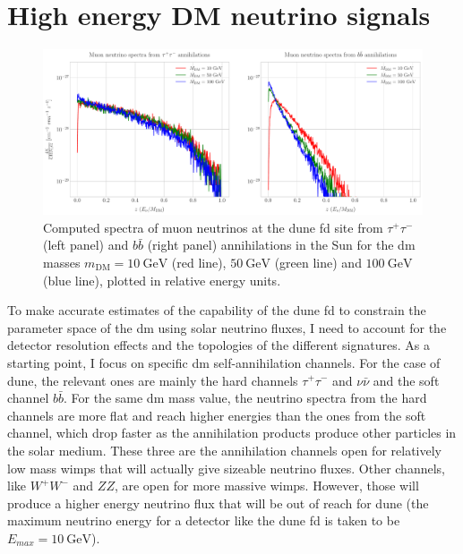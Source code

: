 \section{High energy DM neutrino signals}
\label{sec:dm_analysis_high_e_nu}

\begin{figure}[t]
	\centering
	\includegraphics[width=1\linewidth]{Images/DM_Analysis/solardm_nu_mu_spectra.pdf}
	\caption[Computed spectra of muon neutrinos at the \gls{dune} \gls{fd} site from $\tau^{+} \tau^{-}$ and $b\bar{b}$ annihilations in the Sun for different \gls{dm} masses.]{Computed spectra of muon neutrinos at the \gls{dune} \gls{fd} site from $\tau^{+} \tau^{-}$ (left panel) and $b\bar{b}$ (right panel) annihilations in the Sun for the \gls{dm} masses $m_{\mathrm{DM}} = 10 \ \mathrm{GeV}$ (red line), $50 \ \mathrm{GeV}$ (green line) and $100 \ \mathrm{GeV}$ (blue line), plotted in relative energy units.}
	\label{fig:solardm_nu_mu_spectra}
\end{figure}

To make accurate estimates of the capability of the \gls{dune} \gls{fd} to constrain the parameter space of the \gls{dm} using solar neutrino fluxes, I need to account for the detector resolution effects and the topologies of the different signatures. As a starting point, I focus on specific \gls{dm} self-annihilation channels. For the case of \gls{dune}, the relevant ones are mainly the hard channels $\tau^{+} \tau^{-}$ and $\nu \bar{\nu}$ and the soft channel $b\bar{b}$. For the same \gls{dm} mass value, the neutrino spectra from the hard channels are more flat and reach higher energies than the ones from the soft channel, which drop faster as the annihilation products produce other particles in the solar medium. These three are the annihilation channels open for relatively low mass \gls{wimp}s that will actually give sizeable neutrino fluxes. Other channels, like $W^{+} W^{-}$ and $ZZ$, are open for more massive \gls{wimp}s. However, those will produce a higher energy neutrino flux that will be out of reach for \gls{dune} (the maximum neutrino energy for a detector like the \gls{dune} \gls{fd} is taken to be $E_{max} = 10 \ \mathrm{GeV}$).

